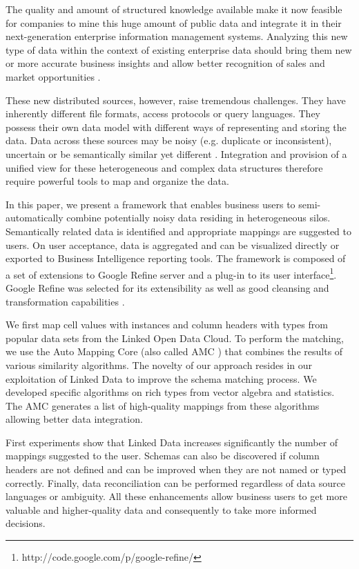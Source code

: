 \documentclass{sig-alternate}
\begin{document}
The quality and amount of structured knowledge available make it now feasible for companies to mine this huge amount of public data and integrate it in their next-generation enterprise information management systems. Analyzing this new type of data within the context of existing enterprise data should bring them new or more accurate business insights and allow better recognition of sales and market opportunities \cite{bigData}.

These new distributed sources, however, raise tremendous challenges. They have inherently different file formats, access protocols or query languages. They possess their own data model with different ways of representing and storing the data. Data across these sources may be noisy (e.g. duplicate or inconsistent), uncertain or be semantically similar yet different \cite{kavitha}. Integration and provision of a unified view for these heterogeneous and complex data structures therefore require powerful tools to map and organize the data. 

In this paper, we present a framework that enables business users to semi-automatically combine potentially noisy data residing in heterogeneous silos. Semantically related data is identified and appropriate mappings are suggested to users. On user acceptance, data is aggregated and can be visualized directly or exported to Business Intelligence reporting tools. The framework is composed of a set of extensions to Google Refine server and a plug-in to its user interface\footnote{http://code.google.com/p/google-refine/}. Google Refine was selected for its extensibility as well as good cleansing and transformation capabilities \cite{bizer_linked_2009}. 

We first map cell values with instances and column headers with types from popular data sets from the Linked Open Data Cloud. To perform the matching, we use the Auto Mapping Core (also called AMC \cite{conf/icde/PeukertER12}) that combines the results of various similarity algorithms. The novelty of our approach resides in our exploitation of Linked Data to improve the schema matching process. We developed specific algorithms on rich types from vector algebra and statistics. The AMC generates a list of high-quality mappings from these algorithms allowing better data integration.

First experiments show that Linked Data increases significantly the number of mappings suggested to the user. Schemas can also be discovered if column headers are not defined and can be improved when they are not named or typed correctly. Finally, data reconciliation can be performed regardless of data source languages or ambiguity. All these enhancements allow business users to get more valuable and higher-quality data and consequently to take more informed decisions. 
\end{document}
